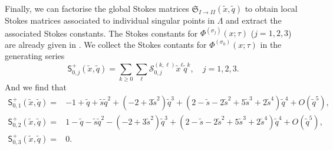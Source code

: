 \documentclass[12pt,reqno]{amsart}
\theoremstyle{definition}
\def\s{\sigma}
\def\tq{\tilde{q}}
\def\tx{\tilde{x}}
\def\tx{\tilde{x}}
\def\ts{\tilde{s}}
\def\mc{\mathcal}
\def\mf{\mathfrak}
\def\ms{\mathsf}
\def\cO{O}
\begin{document}
Finally, we can factorise the global Stokes matrices
$\mf{S}_{I\rightarrow II}(\tx,\tq)$
to obtain local Stokes matrices associated to individual singular
points in $\Lambda$ and extract the associated Stokes constants.  The
Stokes constants for $\Phi^{(\s_j)}(x;\tau)$ ($j=1,2,3$) are already
given in \cite{GGM:resurgent,GGM:peacock}.  We collect the Stokes
contants for $\Phi^{(\s_0)}(x;\tau)$ in the generating series
\begin{equation}
  \ms{S}^+_{0,j}(\tx,\tq) = \sum_{k\geq 0}\sum_{\ell}
  \mc{S}^{(k,\ell)}_{0,j}\tx^\ell\tq^k,
  \quad j=1,2,3.
\end{equation}
And we find that %
\begin{equation}
  \begin{aligned}
    \ms{S}^+_{0,1}(\tx,\tq) =
    &-1+\tq+\ts\tq^2+(-2+3\ts^2)\tq^3+(2-\ts-2\ts^2+5\ts^3+2\ts^4)\tq^4
      +\cO(\tq^5),\\
    \ms{S}^+_{0,2}(\tx,\tq) =
    &1-\tq-\ts\tq^2-(-2+3\ts^2)\tq^3+(2-\ts-2\ts^2+5\ts^3+2\ts^4)\tq^4
      +\cO(\tq^5),\\
    \ms{S}^+_{0,3}(\tx,\tq) =
    &0.
  \end{aligned}
\end{equation}
\end{document}
